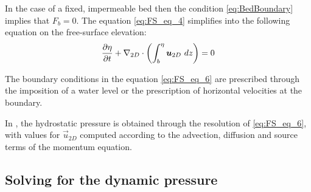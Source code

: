 In the case of a fixed, impermeable bed then the condition \eqref{eq:BedBoundary}
implies that $F_b=0$. The equation \eqref{eq:FS_eq_4} simplifies
into the following equation on the free-surface elevation:
\begin{align}
  \dfrac{\partial\eta}{\partial t}
  + \nabla_{2D} \cdot\left(\int_b^\eta\bm{u}_{2D}~dz\right)
  = 0
  \label{eq:FS_eq_6}
\end{align}

The boundary conditions in the equation \eqref{eq:FS_eq_6} are prescribed through the imposition of a water level or the prescription of horizontal velocities at the boundary.

In , the hydrostatic pressure is obtained through the resolution of \eqref{eq:FS_eq_6}, with values for $\vec{u}_{2D}$
computed according to the advection, diffusion and source terms of the momentum equation.

\subsection{Solving for the dynamic pressure}\label{sec:Chorin}

